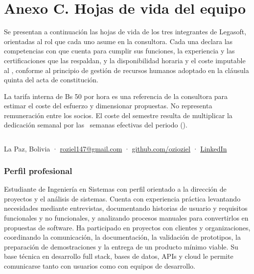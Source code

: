 
\section{Anexo C. Hojas de vida del equipo}

Se presentan a continuación las hojas de vida de los tres integrantes de
Legasoft, orientadas al rol que cada uno asume en la consultora. Cada una declara
las competencias con que cuenta para cumplir sus funciones, la experiencia y las
certificaciones que las respaldan, y la disponibilidad horaria y el coste
imputable al \lgSemestre, conforme al principio de gestión de recursos humanos
adoptado en la cláusula quinta del acta de constitución.

\begin{nota}
La tarifa interna de Bs 50 por hora es una referencia de la consultora para
estimar el coste del esfuerzo y dimensionar propuestas. No representa
remuneración entre los socios. El coste del semestre resulta de multiplicar la
dedicación semanal por las \lgSemanas\ semanas efectivas del periodo
(\lgPeriodo).
\end{nota}

\subsection{\lgDirector}

\begin{nota}[\lgDirectorRol]
La Paz, Bolivia · \href{mailto:roziel147@gmail.com}{roziel147@gmail.com} ·
\href{https://github.com/ozioziel}{github.com/ozioziel} ·
\href{https://www.linkedin.com/in/oziel-rodman-ramos-torrez-98b914403}{LinkedIn}
\end{nota}

\subsubsection{Perfil profesional}

Estudiante de Ingeniería en Sistemas con perfil orientado a la dirección de
proyectos y el análisis de sistemas. Cuenta con experiencia práctica levantando
necesidades mediante entrevistas, documentando historias de usuario y requisitos
funcionales y no funcionales, y analizando procesos manuales para convertirlos en
propuestas de software. Ha participado en proyectos con clientes y
organizaciones, coordinando la comunicación, la documentación, la validación de
prototipos, la preparación de demostraciones y la entrega de un producto mínimo
viable. Su base técnica en desarrollo full stack, bases de datos, APIs y cloud le
permite comunicarse tanto con usuarios como con equipos de desarrollo.

